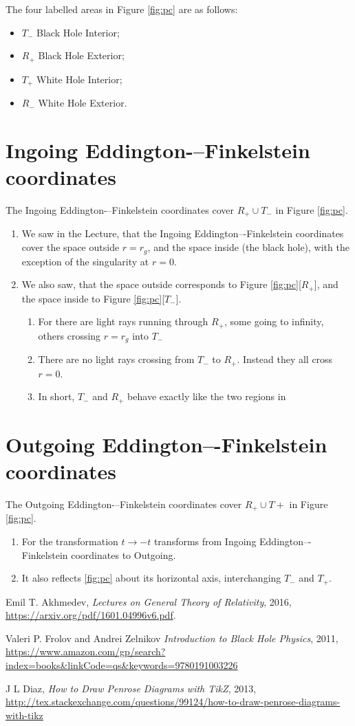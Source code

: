 \documentclass[]{article}
\begin{document}
The four labelled areas in Figure \ref{fig:pc} are as follows:
\begin{itemize}
	\item $T_-$  Black Hole Interior;
	\item $R_+$  Black Hole Exterior;
	\item $T_+$  White Hole Interior;
	\item $R_-$  White Hole Exterior.
\end{itemize}
\section{Ingoing Eddington-–Finkelstein coordinates}
The Ingoing Eddington-–Finkelstein coordinates cover $R_+\cup T_-$ in Figure \ref{fig:pc}.
\begin{enumerate}
	\item We saw in the Lecture, \cite[IV,Figure 8]{akhmedev2016} that the Ingoing Eddington–-Finkelstein coordinates cover the space outside $r=r_g$, and the space inside (the black hole), with the exception of the singularity at $r=0$.
	\item We also saw, \cite[V,Figure 11]{akhmedev2016} that the space outside corresponds to Figure \ref{fig:pc}[$R_+$], and the space inside to Figure \ref{fig:pc}[$T_-$].
	\begin{enumerate}
		\item For there are light rays running through $R_+$, some going to infinity, others crossing $r=r_g$ into $T_-$
		\item There are no light rays crossing from $T_-$ to $R_+$. Instead they all cross $r=0$.
		\item In short, $T_-$ and $R_+$ behave exactly like the two regions in \cite[V,Figure 11]{akhmedev2016}
	\end{enumerate}
\end{enumerate}
\section{Outgoing Eddington–-Finkelstein coordinates}
The Outgoing Eddington-–Finkelstein coordinates cover $R_+ \cup T+$ in Figure \ref{fig:pc}.
\begin{enumerate}
	\item For the transformation $t\rightarrow -t$ transforms from Ingoing Eddington–-Finkelstein coordinates to Outgoing.
	\item It also reflects \ref{fig:pc} about its horizontal axis, interchanging $T_-$ and $T_+$.
\end{enumerate}
\begin{thebibliography}{9}
	\raggedright	
	Emil T. Akhmedev,
	\emph{Lectures on General Theory of Relativity},
	2016,
	\url{https://arxiv.org/pdf/1601.04996v6.pdf}.
	
	Valeri P. Frolov and Andrei Zelnikov
	\emph{Introduction to Black Hole Physics},
	2011,
	\url{https://www.amazon.com/gp/search?index=books&linkCode=qs&keywords=9780191003226}
	
	J L Diaz,
	\emph{How to Draw Penrose Diagrams with TikZ},
	2013,
	\url{http://tex.stackexchange.com/questions/99124/how-to-draw-penrose-diagrams-with-tikz}
\end{thebibliography}
\end{document}
